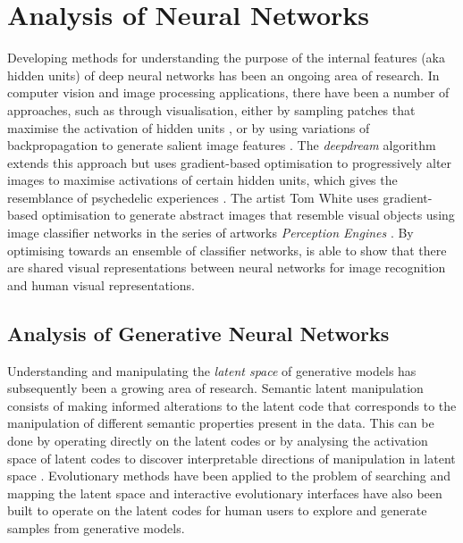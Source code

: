 \section{Analysis of Neural Networks} 

Developing methods for understanding the purpose of the internal features (aka hidden units) of deep neural networks has been an ongoing area of research. 
In computer vision and image processing applications, there have been a number of approaches, such as through visualisation, either by sampling patches that maximise the activation of hidden units \cite{zeiler2014visualizing, zhou2014object}, or by using variations of backpropagation to generate salient image features \cite{zeiler2014visualizing, simonyan2013deep}. 
The \textit{deepdream} algorithm \citep{mordvintsev2015inceptionism} extends this approach but uses gradient-based optimisation to progressively alter images to maximise activations of certain hidden units, which gives the resemblance of psychedelic experiences \citep{suzuki2017deep}.
The artist Tom White uses gradient-based optimisation to generate abstract images that resemble visual objects using image classifier networks in the series of artworks \textit{Perception Engines} \citep{white2018perception}.
By optimising towards an ensemble of classifier networks, \cite{white2019shared} is able to show that there are shared visual representations between neural networks for image recognition and human visual representations.

\subsection{Analysis of Generative Neural Networks}

Understanding and manipulating the \emph{latent space} of generative models has subsequently been a growing area of research. 
Semantic latent manipulation consists of making informed alterations to the latent code that corresponds to the manipulation of different semantic properties present in the data. 
This can be done by operating directly on the latent codes \citep{brock2016neural, shen2020interpreting} or by analysing the activation space of latent codes to discover interpretable directions of manipulation in latent space \citep{harkonen2020ganspace}. 
Evolutionary methods have been applied to the problem of searching and mapping the latent space \citep{bontrager2018deepmasterprints, fernandes2020evolutionary} and interactive evolutionary interfaces have also been built to operate on the latent codes \citep{Simon-ganbreeder} for human users to explore and generate samples from generative models. 

